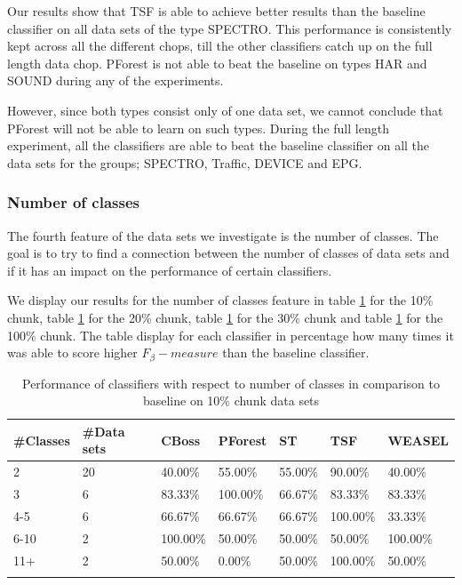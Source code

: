 Our results show that TSF is able to achieve better results than the baseline classifier on all data sets of the type SPECTRO.
This performance is consistently kept across all the different chops, till the other classifiers catch up on the full length data chop.
PForest is not able to beat the baseline on types HAR and SOUND during any of the experiments.

However, since both types consist only of one data set, we cannot conclude that PForest will not be able to learn on such types.
During the full length experiment, all the classifiers are able to beat the baseline classifier on all the data sets for the groups; SPECTRO, Traffic, DEVICE and EPG.


\subsubsection{Number of classes}
The fourth feature of the data sets we investigate is the number of classes.
The goal is to try to find a connection between the number of classes of data sets and if it has an impact on the performance of certain classifiers.

We display our results for the number of classes feature in table \ref{TableNumClass10} for the 10\% chunk, table \ref{TableNumClass10} for the 20\% chunk, table \ref{TableNumClass10} for the 30\% chunk and table \ref{TableNumClass10} for the 100\% chunk.
The table display for each classifier in percentage how many times it was able to score higher $F_{\beta}-measure$ than the baseline classifier.

\begin{table}[hp!]
	\setlength\extrarowheight{2pt} %
	\begin{tabularx}{\textwidth}{|X|X|X|X|X|X|X|}
	\hline
	\textbf{\#Classes} & \textbf{\#Data sets} & \textbf{CBoss} & \textbf{PForest} & \textbf{ST} & \textbf{TSF} & \textbf{WEASEL} \\ \hline
		2 & 20 & 40.00\% & 55.00\% & 55.00\% & 90.00\% & 40.00\% \\ \hline
		3 & 6 & 83.33\% & 100.00\% & 66.67\% & 83.33\% & 83.33\% \\ \hline
		4-5 & 6 & 66.67\% & 66.67\% & 66.67\% & 100.00\% & 33.33\% \\ \hline
		6-10 & 2 & 100.00\% & 50.00\% & 50.00\% & 50.00\% & 100.00\% \\ \hline
		11+ & 2 & 50.00\% & 0.00\% & 50.00\% & 100.00\% & 50.00\% \\ \hline
  \caption{Performance of classifiers with respect to number of classes in comparison to baseline on 10\% chunk data sets}
  \label{TableNumClass10}
  \end{tabularx}
\end{table}

